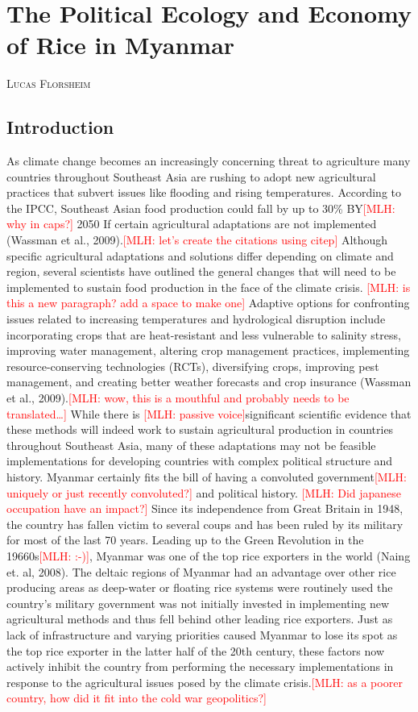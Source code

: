 \documentclass{book}\usepackage{knitr}
\makeatletter
\newcommand{\red}[1]{\textcolor{red}{[MLH: #1]}}
\newcommand{\chapterauthor}[1]{%
  {\parindent0pt\vspace*{-25pt}%
  \linespread{1.1}\large\scshape#1%
  \par\nobreak\vspace*{35pt}}
  \@afterheading%
}
\makeatother
\begin{document}
{\chapter{The Political Ecology and Economy of Rice in Myanmar}

\chapterauthor{Lucas Florsheim}

\section{Introduction}

As climate change becomes an increasingly concerning threat to agriculture many countries throughout Southeast Asia are rushing to adopt new agricultural practices that subvert issues like flooding and rising temperatures. According to the IPCC, Southeast Asian food production could fall by up to 30\% BY\red{why in caps?} 2050 If certain agricultural adaptations are not implemented (Wassman et al., 2009).\red{let's create the citations using citep{}} Although specific agricultural adaptations and solutions differ depending on climate and region, several scientists have outlined the general changes that will need to be implemented to sustain food production in the face of the climate crisis. \red{is this a new paragraph? add a space to make one}
Adaptive options for confronting issues related to increasing temperatures and hydrological disruption include incorporating crops that are heat-resistant and less vulnerable to salinity stress, improving water management, altering crop management practices, implementing resource-conserving technologies (RCTs), diversifying crops, improving pest management, and creating better weather forecasts and crop insurance (Wassman et al., 2009).\red{wow, this is a mouthful and probably needs to be translated\ldots} While there is \red{passive voice}significant scientific evidence that these methods will indeed work to sustain agricultural production in countries throughout Southeast Asia, many of these adaptations may not be feasible implementations for developing countries with complex political structure and history. 
Myanmar certainly fits the bill of having a convoluted government\red{uniquely or just recently convoluted?} and political history. \red{Did japanese occupation have an impact?} Since its independence from Great Britain in 1948, the country has fallen victim to several coups and has been ruled by its military for most of the last 70 years. Leading up to the Green Revolution in the 19660s\red{:-)}, Myanmar was one of the top rice exporters in the world (Naing et. al, 2008). The deltaic regions of Myanmar had an advantage over other rice producing areas as deep-water or floating rice systems were routinely used the country’s military government was not initially invested in implementing new agricultural methods and thus fell behind other leading rice exporters. Just as lack of infrastructure and varying priorities caused Myanmar to lose its spot as the top rice exporter in the latter half of the 20th century, these factors now actively inhibit the country from performing the necessary implementations in response to the agricultural issues posed by the climate crisis.\red{as a poorer country, how did it fit into the cold war geopolitics?} 
}
\end{document}
